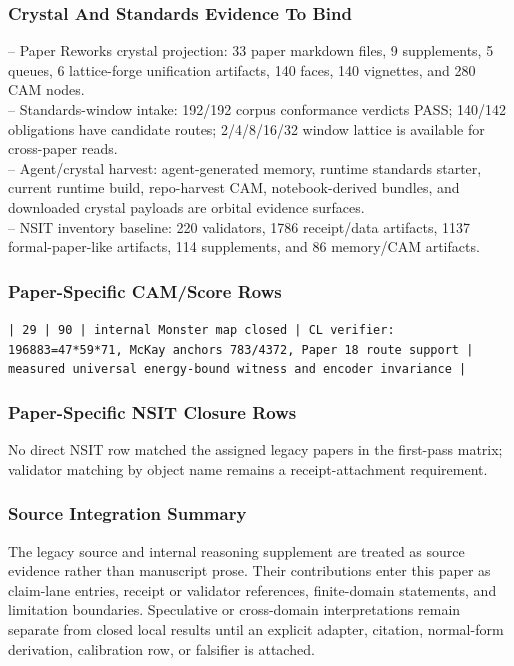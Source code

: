 \documentclass[11pt]{article}
\begin{document}
\subsubsection*{Crystal And Standards Evidence To Bind}

\noindent{}-- Paper Reworks crystal projection: 33 paper markdown files, 9 supplements, 5 queues, 6 lattice-forge unification artifacts, 140 faces, 140 vignettes, and 280 CAM nodes.\\
\noindent{}-- Standards-window intake: 192/192 corpus conformance verdicts PASS; 140/142 obligations have candidate routes; 2/4/8/16/32 window lattice is available for cross-paper reads.\\
\noindent{}-- Agent/crystal harvest: agent-generated memory, runtime standards starter, current runtime build, repo-harvest CAM, notebook-derived bundles, and downloaded crystal payloads are orbital evidence surfaces.\\
\noindent{}-- NSIT inventory baseline: 220 validators, 1786 receipt/data artifacts, 1137 formal-paper-like artifacts, 114 supplements, and 86 memory/CAM artifacts.\\

\subsubsection*{Paper-Specific CAM/Score Rows}

\noindent\texttt{| 29 | 90 | internal Monster map closed | CL verifier: 196883=47*59*71, McKay anchors 783/4372, Paper 18 route support | measured universal energy-bound witness and encoder invariance |}\\

\subsubsection*{Paper-Specific NSIT Closure Rows}

No direct NSIT row matched the assigned legacy papers in the first-pass matrix; validator matching by object name remains a receipt-attachment requirement.

\subsubsection*{Source Integration Summary}

The legacy source and internal reasoning supplement are treated as source
evidence rather than manuscript prose. Their contributions enter this paper as
claim-lane entries, receipt or validator references, finite-domain statements,
and limitation boundaries. Speculative or cross-domain interpretations remain
separate from closed local results until an explicit adapter, citation,
normal-form derivation, calibration row, or falsifier is attached.
\end{document}
